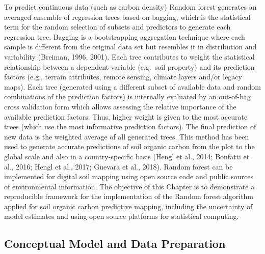 \documentclass[10pt,b5paper,]{book}
\theoremstyle{definition}
\theoremstyle{definition}
\theoremstyle{definition}
\theoremstyle{remark}
\begin{document}
To predict continuous data (such as carbon density) Random forest
generates an averaged ensemble of regression trees based on bagging,
which is the statistical term for the random selection of subsets and
predictors to generate each regression tree. Bagging is a bootstrapping
aggregation technique where each sample is different from the original
data set but resembles it in distribution and variability (Breiman,
1996, 2001). Each tree contributes to weight the statistical
relationship between a dependent variable (e.g.~soil property) and its
prediction factors (e.g., terrain attributes, remote sensing, climate
layers and/or legacy maps). Each tree (generated using a different
subset of available data and random combinations of the prediction
factors) is internally evaluated by an out-of-bag cross validation form
which allows assessing the relative importance of the available
prediction factors. Thus, higher weight is given to the most accurate
trees (which use the most informative prediction factors). The final
prediction of new data is the weighted average of all generated trees.
This method has been used to generate accurate predictions of soil
organic carbon from the plot to the global scale and also in a
country-specific basis (Hengl et al., 2014; Bonfatti et al., 2016; Hengl
et al., 2017; Guevara et al., 2018). Random forest can be implemented
for digital soil mapping using open source code \citep[e.g., the R
package of random forest, see][]{breiman2017cutler} and public sources
of environmental information. The objective of this Chapter is to
demonstrate a reproducible framework for the implementation of the
Random forest algorithm applied for soil organic carbon predictive
mapping, including the uncertainty of model estimates and using open
source platforms for statistical computing.

\hypertarget{conceptual-model-and-data-preparation}{%
\subsection{Conceptual Model and Data
Preparation}\label{conceptual-model-and-data-preparation}}
\end{document}
